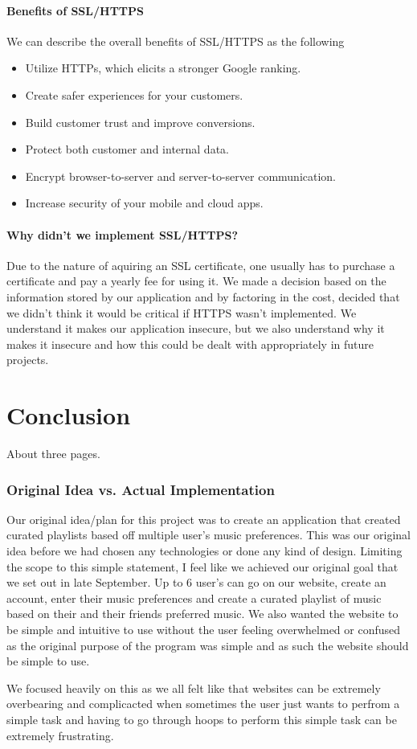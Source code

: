     \subsubsection{Benefits of SSL/HTTPS}
    We can describe the overall benefits of SSL/HTTPS as the following

    \begin{itemize}
      \item Utilize HTTPs, which elicits a stronger Google ranking.
      \item Create safer experiences for your customers.
      \item Build customer trust and improve conversions.
      \item Protect both customer and internal data.
      \item Encrypt browser-to-server and server-to-server communication.
      \item Increase security of your mobile and cloud apps.
    \end{itemize}

    \subsubsection{Why didn't we implement SSL/HTTPS?}
    Due to the nature of aquiring an SSL certificate, one usually has to purchase a certificate and pay a yearly fee for using it. We made a decision based on the information stored by our application and by factoring in the cost, decided that we didn't think it would be critical if HTTPS wasn't implemented.
    We understand it makes our application insecure, but we also understand why it makes it insecure and how this could be dealt with appropriately in future projects.


\chapter{Conclusion}
About three pages.

\subsection{Original Idea vs. Actual Implementation}
Our original idea/plan for this project was to create an application that created curated playlists based off multiple user's music preferences. This was our original idea before we had chosen any technologies or done any kind of design. Limiting the scope to this simple statement, I feel like we achieved our original goal that we set out in late September.
Up to 6 user's can go on our website, create an account, enter their music preferences and create a curated playlist of music based on their and their friends preferred music. We also wanted the website to be simple and intuitive to use without the user feeling overwhelmed or confused as the original purpose of the program was simple and as such the website should be simple to use. \par
We focused heavily on this as we all felt like that websites can be extremely overbearing and complicacted when sometimes the user just wants to perfrom a simple task and having to go through hoops to perform this simple task can be extremely frustrating.

